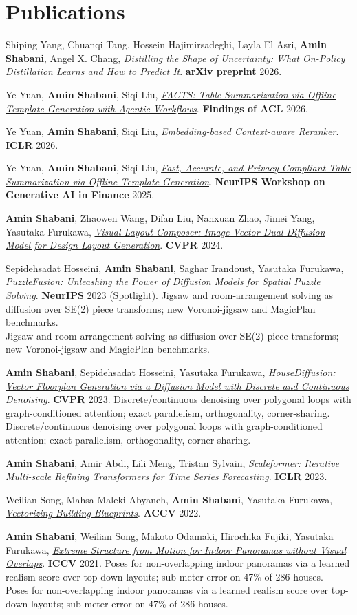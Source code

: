 \documentclass[10pt,letterpaper]{article}
\newcommand{\venue}[1]{{\ttfamily\footnotesize\color{accent}#1}}
\newcommand{\me}{\textbf{Amin Shabani}}
\newcommand{\soft}[1]{{\color{inksoft}#1}}
\newcommand{\pub}[6]{%
  \item #1, \href{#3}{\emph{#2}}. \venue{\textbf{#4} #5}.%
  \ifx\relax#6\relax\else\\ \soft{\small #6}\fi}
\begin{document}
\section{Publications}
\begin{pubs}
\pub{Shiping Yang, Chuanqi Tang, Hossein Hajimirsadeghi, Layla El Asri, \me, Angel X. Chang}{Distilling the Shape of Uncertainty: What On-Policy Distillation Learns and How to Predict It}{https://arxiv.org/abs/2610.39020}{arXiv preprint}{2026}{}
\pub{Ye Yuan, \me, Siqi Liu}{FACTS: Table Summarization via Offline Template Generation with Agentic Workflows}{https://aclanthology.org/2026.findings-acl.453.pdf}{Findings of ACL}{2026}{}
\pub{Ye Yuan, \me, Siqi Liu}{Embedding-based Context-aware Reranker}{https://arxiv.org/abs/2510.13329}{ICLR}{2026}{}
\pub{Ye Yuan, \me, Siqi Liu}{Fast, Accurate, and Privacy-Compliant Table Summarization via Offline Template Generation}{https://openreview.net/pdf?id=wfhumSU3lw}{NeurIPS Workshop on Generative AI in Finance}{2025}{}
\pub{\me, Zhaowen Wang, Difan Liu, Nanxuan Zhao, Jimei Yang, Yasutaka Furukawa}{Visual Layout Composer: Image-Vector Dual Diffusion Model for Design Layout Generation}{https://openaccess.thecvf.com/content/CVPR2024/papers/Shabani_Visual_Layout_Composer_Image-Vector_Dual_Diffusion_Model_for_Design_Layout_CVPR_2024_paper.pdf}{CVPR}{2024}{}
\pub{Sepidehsadat Hosseini, \me, Saghar Irandoust, Yasutaka Furukawa}{PuzzleFusion: Unleashing the Power of Diffusion Models for Spatial Puzzle Solving}{https://arxiv.org/abs/2211.13785}{NeurIPS}{2023 (Spotlight)}{Jigsaw and room-arrangement solving as diffusion over SE(2) piece transforms; new Voronoi-jigsaw and MagicPlan benchmarks.}
\pub{\me, Sepidehsadat Hosseini, Yasutaka Furukawa}{HouseDiffusion: Vector Floorplan Generation via a Diffusion Model with Discrete and Continuous Denoising}{https://shabani.me/housediffusion/}{CVPR}{2023}{Discrete/continuous denoising over polygonal loops with graph-conditioned attention; exact parallelism, orthogonality, corner-sharing.}
\pub{\me, Amir Abdi, Lili Meng, Tristan Sylvain}{Scaleformer: Iterative Multi-scale Refining Transformers for Time Series Forecasting}{https://arxiv.org/abs/2206.04038}{ICLR}{2023}{}
\pub{Weilian Song, Mahsa Maleki Abyaneh, \me, Yasutaka Furukawa}{Vectorizing Building Blueprints}{https://openaccess.thecvf.com/content/ACCV2022/papers/Song_Vectorizing_Building_Blueprints_ACCV_2022_paper.pdf}{ACCV}{2022}{}
\pub{\me, Weilian Song, Makoto Odamaki, Hirochika Fujiki, Yasutaka Furukawa}{Extreme Structure from Motion for Indoor Panoramas without Visual Overlaps}{https://shabani.me/publications/extreme_sfm/}{ICCV}{2021}{Poses for non-overlapping indoor panoramas via a learned realism score over top-down layouts; sub-meter error on 47\% of 286 houses.}

\end{pubs}
\end{document}
